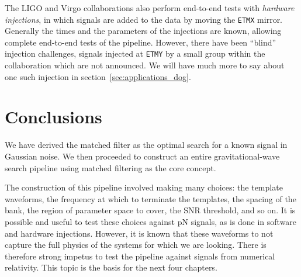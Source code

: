The LIGO and Virgo collaborations also perform end-to-end tests with
\emph{hardware injections}, in which signals are added to the data by
moving the \texttt{ETMX} mirror.  Generally the times and the
parameters of the injections are known, allowing complete end-to-end
tests of the pipeline.  However, there have been ``blind'' injection
challenges, signals injected at \texttt{ETMY} by a small group within
the collaboration which are not announced.  We will have much more to
say about one such injection in section~\ref{sec:applications_dog}.

\section{Conclusions}

We have derived the matched filter as the optimal search for a known
signal in Gaussian noise.  We then proceeded to construct an entire
gravitational-wave search pipeline using matched filtering as the core
concept.

The construction of this pipeline involved making many choices: the
template waveforms, the frequency at which to terminate the templates,
the spacing of the bank, the region of parameter space to cover, the
SNR threshold, and so on.  It is possible and useful to test
these choices against pN signals, as is done in software and hardware
injections.   However, it is known that these waveforms to not capture
the full physics of the systems for which we are looking.  There is
therefore strong impetus to test the pipeline against signals from
numerical relativity.  This topic is the basis for the next four
chapters.



